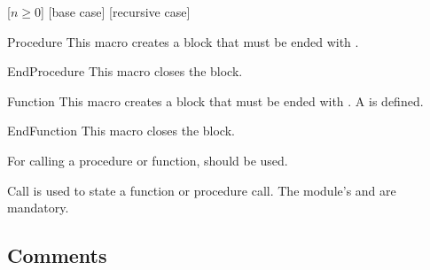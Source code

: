 \documentclass[a4paper, 11pt]{article}
\begin{document}
\begin{PDExample}
    \begin{algorithmic}
        [$n \geq 0$]
                [base case]
            \Else
                [recursive case]
            \EndIf
        \EndFunction
    \end{algorithmic}
\end{PDExample}

\begin{Macrodef}{Procedure}{}{}
    This macro creates a  block that must be ended with .

    \BlockOptionsText
\end{Macrodef}

\begin{Macrodef}{EndProcedure}{}{}
    This macro closes the  block.

    \MacroOptionsText
\end{Macrodef}

\begin{Macrodef}{Function}{}{}
    This macro creates a  block that must be ended with . A  is defined.

    \BlockOptionsText
\end{Macrodef}

\begin{Macrodef}{EndFunction}{}{}
    This macro closes the  block.

    \MacroOptionsText
\end{Macrodef}

For calling a procedure or function,  should be used.

\begin{Macrodef}{Call}{}{}
    \label{call}
     is used to state a function or procedure call. The module's  and  are mandatory.

    \MacroOptionsText
\end{Macrodef}

\subsection{Comments}\label{sec:comments}
\end{document}

